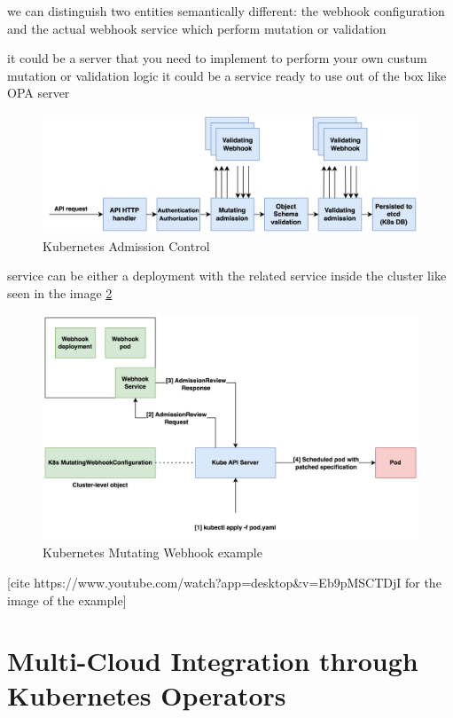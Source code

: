 we can distinguish two entities semantically different: the webhook configuration and the actual webhook service which perform mutation or validation

it could be a server that you need to implement to perform your own custum mutation or validation logic
it could be a service ready to use out of the box like OPA server

\begin{figure}[htb]
  \centering
  \includegraphics[width=1\linewidth]{images/k8s_admission.png}
  \caption{Kubernetes Admission Control}
  \label{fig:k8s_admission_control}
\end{figure}


service can be either a deployment with the related service
inside the cluster like seen in the image \ref{fig:k8s_webhook_example}

\begin{figure}[htb]
  \centering
  \includegraphics[width=1\linewidth]{images/k8s_webhook_example.png}
  \caption{Kubernetes Mutating Webhook example}
  \label{fig:k8s_webhook_example}
\end{figure}

[cite https://www.youtube.com/watch?app=desktop&v=Eb9pMSCTDjI for the image of the example]

\section{Multi-Cloud Integration through Kubernetes Operators}

